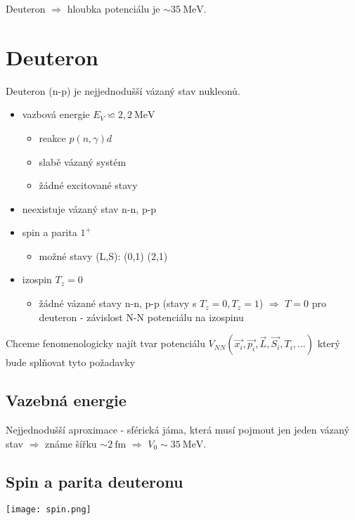 \documentclass[../../main.tex]{subfiles}
\begin{document}
Deuteron $\Rightarrow$ hloubka potenciálu je $\sim 35 ~\mathrm{MeV}$.

\section{Deuteron}

Deuteron (n-p) je nejjednodušší vázaný stav nukleonů. 
\begin{itemize}
	\item vazbová energie $E_V \backsimeq 2,2 ~\mathrm{MeV}$
	\begin{itemize}
		\item reakce $p(n, \gamma)d$
		\item slabě vázaný systém
		\item žádné excitované stavy
	\end{itemize}
	\item neexistuje vázaný stav n-n, p-p
	\item spin a parita $1^+$
	\begin{itemize}
		\item možné stavy (L,S): (0,1) (2,1)
	\end{itemize}
	\item 	izospin $T_z = 0$
	\begin{itemize}
		\item žádné vázané stavy n-n, p-p (stavy s $T_z = 0, T_z = 1$) $\Rightarrow$ $T=0 $ pro deuteron - závislost N-N potenciálu na izospinu
	\end{itemize}	
\end{itemize}
Chceme fenomenologicky najít tvar potenciálu $V_{NN} (\vec{x_i}, \vec{p_i}, \vec{L}, \vec{S_i}, T_i, ...)$ který bude splňovat tyto požadavky

\subsection{Vazebná energie}

Nejjednodušší aproximace - sférická jáma, která musí pojmout jen jeden vázaný stav $\Rightarrow$ známe šířku $\sim 2 ~\mathrm{fm} $ $\Rightarrow$ $V_0 \sim 35 ~\mathrm{MeV}$.

\subsection{Spin a parita deuteronu}

\begin{center}
	\texttt{[image: spin.png]}
\end{center}
\end{document}
